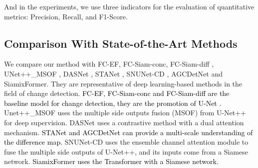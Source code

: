\documentclass[lettersize,journal]{IEEEtran}
\newcommand{\editb}[1]{\textcolor{black}{#1}}
\begin{document}
And in the experiments, we use three indicators for the evaluation of quantitative metrics: Precision, Recall, and F1-Score.

\subsection{Comparison With State-of-the-Art Methods}

We compare our method with FC-EF, FC-Siam-conc, FC-Siam-diff \cite{daudt2018fully}, UNet++\_MSOF \cite{peng2019end}, DASNet \cite{chen2020dasnet}, STANet \cite{chen2020spatial}, SNUNet-CD \cite{fang2021snunet}, AGCDetNet \cite{song2021agcdetnet} and SiamixFormer\cite{ghaderi2022siamixformer}.
They are representative of deep learning-based methods in the field of change detection.
\editb{FC-EF, FC-Siam-conc and FC-Siam-diff \cite{daudt2018fully} are the baseline model for change detection, they are the promotion of U-Net \cite{ronneberger2015u}.}
Unet++\_MSOF uses the multiple side outputs fusion (MSOF) from U-Net++ \cite{zhou2018unet++} for deep supervision.
DASNet uses a contrastive method with a dual attention mechanism.
\editb{STANet and AGCDetNet can provide a multi-scale understanding of the difference map.} 
SNUNet-CD uses the ensemble channel attention module to fuse the multiple side outputs of U-Net++, and its inputs come from a Siamese network.
\editb{SiamixFormer uses the Transformer with a Siamese network.}
\end{document}
